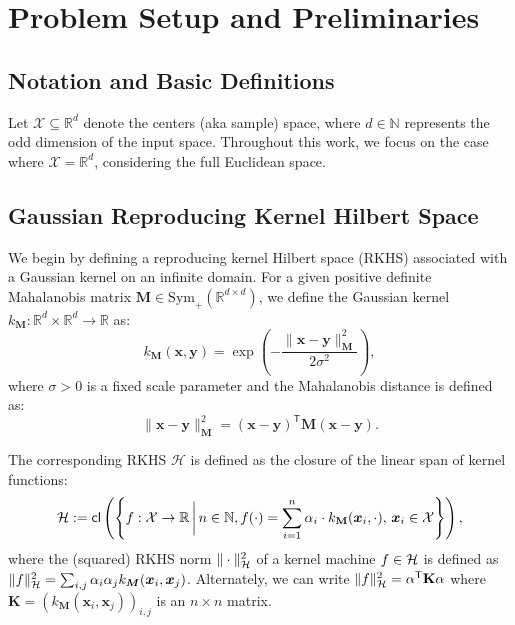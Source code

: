 \section{Problem Setup and Preliminaries}\label{sec: setup}

\subsection{Notation and Basic Definitions}
Let $\mathcal{X} \subseteq \mathbb{R}^d$ denote the centers (aka sample) space, where $d \in \mathbb{N}$ represents the odd dimension of the input space. Throughout this work, we focus on the case where $\mathcal{X} = \mathbb{R}^d$, considering the full Euclidean space.

\subsection{Gaussian Reproducing Kernel Hilbert Space}
We begin by defining a reproducing kernel Hilbert space (RKHS) associated with a Gaussian kernel on an infinite domain. For a given positive definite Mahalanobis matrix $\mathbf{M} \in \text{Sym}_{+}(\mathbb{R}^{d \times d})$, we define the Gaussian kernel $k_{\mathbf{M}}: \mathbb{R}^d \times \mathbb{R}^d \to \mathbb{R}$ as:
\begin{equation}
    k_{\mathbf{M}}(\bm{x},\bm{y}) = \exp\left(-\frac{\|\bm{x}-\bm{y}\|_\mathbf{M}^2}{2\sigma^2}\right),
\end{equation}
where $\sigma > 0$ is a fixed scale parameter and the Mahalanobis distance is defined as:
\begin{equation}
    \|\bm{x} - \bm{y}\|_\mathbf{M}^2 = (\bm{x} - \bm{y})^{\mathsf{T}}\mathbf{M}(\bm{x} - \bm{y}).
\end{equation}

The corresponding RKHS $\mathcal{H}$ is defined as the closure of the linear span of kernel functions:
\begin{align}
    {\mathcal{H}} := \textsf{cl} \left( {\left\{f: {\mathcal{X}} \to \mathbb{R}\,\bigg\lvert\, n \in \mathbb{N}, f(\cdot) = \sum_{i = 1}^n \alpha_i \cdot k_{\mathbf{M}}(\bm{x}_i,\cdot),\, \bm{x}_i \in {\mathcal{X}}\right\}} \right) , \label{eq: infinitegauss}
\end{align}
where the (squared) RKHS norm $\|\cdot\|_{{\mathcal{H}}}^2$ of a kernel machine $f \in {\mathcal{H}}$ is defined as $\|f\|_{{\mathcal{H}}}^2 = \sum_{i,j} \alpha_i \alpha_j k_{\bm{M}}(\bm{x}_i,\bm{x}_j)$. Alternately, we can write $\|f\|_{{\mathcal{H}}}^2 = \alpha^{\mathsf{T}}\mathbf{K}\alpha$ where $\mathbf{K} = (k_{\mathbf{M}}(\bm{x}_i,\bm{x}_j))_{i,j}$ is an $n \times n$ matrix. 

